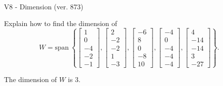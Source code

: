 \begin{exercise}
  \begin{exerciseTitle}V8 - Dimension (ver. 873)\end{exerciseTitle}
  \begin{exerciseStatement}
    Explain how to find the dimension of 
\[W=\mathrm{span}\ \left\{\left[\begin{array}{r}
1 \\
0 \\
-4 \\
-2 \\
-1
\end{array}\right] , \left[\begin{array}{r}
2 \\
-2 \\
-2 \\
1 \\
-3
\end{array}\right] , \left[\begin{array}{r}
-6 \\
8 \\
0 \\
-8 \\
10
\end{array}\right] , \left[\begin{array}{r}
-4 \\
0 \\
-4 \\
-4 \\
-4
\end{array}\right] , \left[\begin{array}{r}
4 \\
-14 \\
-14 \\
3 \\
-27
\end{array}\right]\right\}.\]



  \end{exerciseStatement}
  \begin{exerciseAnswer}
   The dimension of \(W\) is  \(3\).
  


  \end{exerciseAnswer}
\end{exercise}